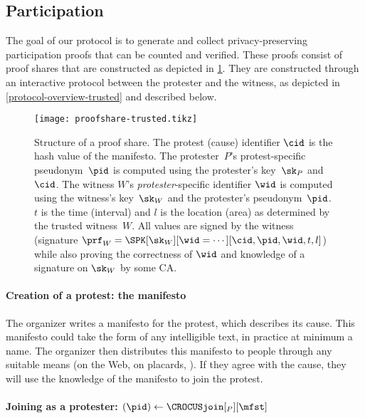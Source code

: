 \subsection{Participation}%
\label{ProtocolDuring}

The goal of our protocol is to generate and collect privacy-preserving
participation proofs that can be counted and verified. These proofs
consist of proof shares that are constructed as depicted in
\cref{proofshare-trusted-fig}.
They are constructed through an interactive protocol between the protester and 
the witness, as depicted in \cref{protocol-overview-trusted} and described below.

\begin{figure}
  \centering
  \small
  \texttt{[image: proofshare-trusted.tikz]}
  \caption{%
    Structure of a proof share.
    The protest (cause) identifier \(\cid\) is the hash value of the manifesto.
    The protester~\(P\)'s protest-specific pseudonym~\(\pid\) is computed using 
    the protester's key~\(\sk_P\) and \(\cid\).
    The witness \(W\)'s \emph{protester}-specific identifier \(\wid\) is 
    computed using the witness's key~\(\sk_W\) and the protester's 
    pseudonym~\(\pid\).
    \(t\) is the time (interval) and \(l\) is the location (area) as determined 
    by the trusted witness~\(W\).
    All values are signed by the witness (signature \(\prf_W = \SPK[\sk_W][\wid 
    = \dotsb][\cid, \pid, \wid, t, l]\)) while also proving the correctness of 
    \(\wid\) and knowledge of a signature on \(\sk_W\) by some \ac{CA}.
  }%
  \label{proofshare-trusted-fig}
\end{figure}%


\paragraph*{Creation of a protest: the manifesto}

The organizer writes a manifesto for the protest, which describes its cause.
This manifesto could take the form of any intelligible text, in
practice at minimum a name.
The organizer then distributes this manifesto to people through
any suitable means  (\eg on the Web, on placards, \etc).
If they agree with the cause, they will use the knowledge of the
manifesto to join the protest. 


\paragraph*{Joining as a protester:
  \((\pid)\gets \CROCUSjoin[_P][\mfst]\)}


